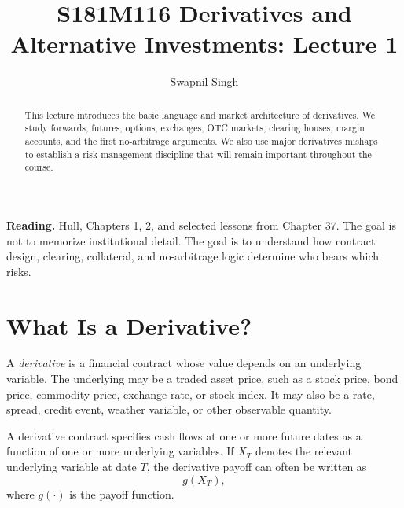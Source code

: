 

\title{S181M116 Derivatives and Alternative Investments: Lecture 1}
\author{Swapnil Singh}
\date{}


\setlength{\headheight}{26pt}
\graphicspath{{images/lecture-1/}}

\newcommand{\St}{S_T}
\newcommand{\Fzero}{F_0}
\newcommand{\Ft}{F_t}
\newcommand{\K}{K}
\newcommand{\pnl}{\mathrm{P\&L}}
\newcommand{\PV}{\mathrm{PV}}


\maketitle

\begin{abstract}
This lecture introduces the basic language and market architecture of derivatives.
We study forwards, futures, options, exchanges, OTC markets, clearing houses,
margin accounts, and the first no-arbitrage arguments. We also use major
derivatives mishaps to establish a risk-management discipline that will remain
important throughout the course.
\end{abstract}

\begin{boxD}
\textbf{Reading.} Hull, Chapters 1, 2, and selected lessons from Chapter 37.
The goal is not to memorize institutional detail. The goal is to understand how
contract design, clearing, collateral, and no-arbitrage logic determine who bears
which risks.
\end{boxD}

\section{What Is a Derivative?}

A \emph{derivative} is a financial contract whose value depends on an underlying
variable. The underlying may be a traded asset price, such as a stock price,
bond price, commodity price, exchange rate, or stock index. It may also be a
rate, spread, credit event, weather variable, or other observable quantity.

\begin{defN}[Derivative]
A derivative contract specifies cash flows at one or more future dates as a
function of one or more underlying variables. If $X_T$ denotes the relevant
underlying variable at date $T$, the derivative payoff can often be written as
\[
    g(X_T),
\]
where $g(\cdot)$ is the payoff function.
\end{defN}

